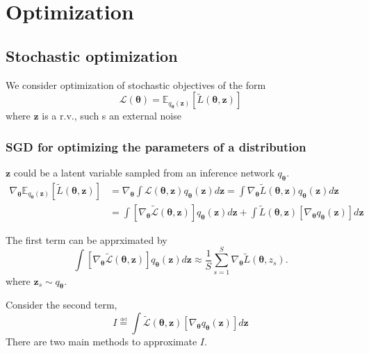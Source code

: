 \documentclass[../main.tex]{subfiles}
\begin{document}
\chapter{Optimization}


\section{Stochastic optimization}

We consider optimization of stochastic objectives of the form
\[
\mathcal{L}(\boldsymbol{\theta}) = \mathbb{E}_{q_{\boldsymbol{\theta}}(\boldsymbol{z})}\left[ \tilde{L}(\boldsymbol{\theta}, \boldsymbol{z}) \right] 
\]
where $\boldsymbol{z}$ is a r.v., such s an external noise


\subsection{SGD for optimizing the parameters of a distribution}

$\boldsymbol{z}$ could be a latent variable sampled from an inference network $q_{\boldsymbol{\theta}}$.
\[
\begin{aligned}
\nabla_{\boldsymbol{\theta}} \mathbb{E}_{q_{\boldsymbol{\theta}}(\boldsymbol{z})}\left[ \tilde{L}(\boldsymbol{\theta}, \boldsymbol{z}) \right]  &= \nabla_{\boldsymbol{\theta}} \int \mathcal{L}(\boldsymbol{\theta}, \boldsymbol{z}) q_{\boldsymbol{\theta}}(\boldsymbol{z}) d\boldsymbol{z} = \int \nabla _{\boldsymbol{\theta}} \tilde{L}(\boldsymbol{\theta}, \boldsymbol{z}) q_{\boldsymbol{\theta}}(\boldsymbol{z}) d \boldsymbol{z} \\
&= \int \left[ \nabla_{\boldsymbol{\theta}} \tilde{\mathcal{L}}(\boldsymbol{\theta}, \boldsymbol{z}) \right] q_{\boldsymbol{\theta}}(\boldsymbol{z}) d \boldsymbol{z} + \int \tilde{L}(\boldsymbol{\theta}, \boldsymbol{z}) \left[ \nabla_{\boldsymbol{\theta}} q_{\boldsymbol{\theta}}(\boldsymbol{z}) \right] d \boldsymbol{z}
\end{aligned}
\]

The first term can be apprximated by
\[
\int \left[ \nabla_{\boldsymbol{\theta}} \tilde{\mathcal{L}} (\boldsymbol{\theta}, \boldsymbol{z})\right] q_{\boldsymbol{\theta}}(\boldsymbol{z}) d \boldsymbol{z} \approx  \frac{1}{S} \sum_{s=1}^{S} \nabla_{\boldsymbol{\theta}} \tilde{L}(\boldsymbol{\theta}, z_{s}).
\]
where $\boldsymbol{z}_{s} \sim  q_{\boldsymbol{\theta}}$. 

Consider the second term, 
\[
I  \overset{\underset{\mathrm{def}}{}}{=} \int \tilde{\mathcal{L}}(\boldsymbol{\theta}, \boldsymbol{z}) \left[ \nabla_{\boldsymbol{\theta}} q_{\boldsymbol{\theta}}(\boldsymbol{z}) \right] d\boldsymbol{z}
\]
There are two main methods to approximate $I$.
\end{document}
